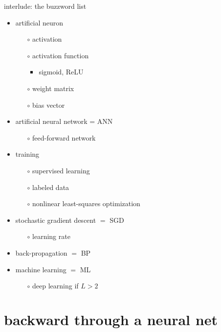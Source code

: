 \documentclass[xcolor={svgnames},
               hyperref={colorlinks,citecolor=DeepPink4,linkcolor=FireBrick,urlcolor=Maroon}]
               {beamer}
\begin{document}
\begin{frame}{interlude: the buzzword list}

\begin{itemize}
\item \alert{artificial neuron}
    \begin{itemize}
    \item[$\circ$] \alert{activation}
    \item[$\circ$] \alert{activation function}
        \begin{itemize}
        \item sigmoid, ReLU
        \end{itemize}
    \item[$\circ$] \alert{weight} matrix
    \item[$\circ$] \alert{bias} vector
    \end{itemize}
\item \alert{artificial neural network} = ANN
    \begin{itemize}
    \item[$\circ$] feed-forward network
    \end{itemize}
\item \alert{training}
    \begin{itemize}
    \item[$\circ$] \alert{supervised learning}
    \item[$\circ$] labeled data
    \item[$\circ$] nonlinear least-squares optimization
    \end{itemize}
\item \alert{stochastic gradient descent} $=$ SGD
    \begin{itemize}
    \item[$\circ$] learning rate
    \end{itemize}
\item \alert{back-propagation} $=$ BP

\hspace{-7mm} \hrulefill
\item \alert{machine learning} $=$ ML
    \begin{itemize}
    \item[$\circ$] \alert{deep learning} if $L>2$
    \end{itemize}
\end{itemize}
\end{frame}


\section{backward through a neural net}
\end{document}
